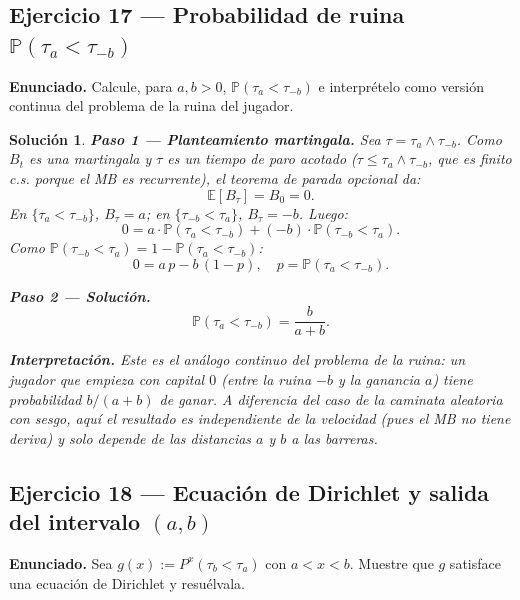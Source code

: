 \documentclass[12pt,letterpaper]{article}
\theoremstyle{ejercicio}
\theoremstyle{solucion}
\newtheorem*{solucion}{Solución}
\newcommand{\E}{\mathbb{E}}
\renewcommand{\P}{\mathbb{P}}
\begin{document}
\subsection*{Ejercicio 17 — Probabilidad de ruina $\P(\tau_a<\tau_{-b})$}

\begin{recuadro}
\textbf{Enunciado.} Calcule, para $a,b>0$,
$\P(\tau_a<\tau_{-b})$
e interprételo como versión continua del problema de la ruina del jugador.
\end{recuadro}

\begin{solucion}

\textbf{Paso 1 — Planteamiento martingala.}
Sea $\tau=\tau_a\wedge\tau_{-b}$. Como $B_t$ es una martingala y $\tau$ es un tiempo de paro
acotado ($\tau\le\tau_a\wedge\tau_{-b}$, que es finito c.s. porque el MB es recurrente), el
teorema de parada opcional da:
\[
  \E[B_\tau] = B_0 = 0.
\]
En $\{\tau_a<\tau_{-b}\}$, $B_\tau=a$; en $\{\tau_{-b}<\tau_a\}$, $B_\tau=-b$. Luego:
\[
  0 = a\cdot\P(\tau_a<\tau_{-b}) + (-b)\cdot\P(\tau_{-b}<\tau_a).
\]
Como $\P(\tau_{-b}<\tau_a)=1-\P(\tau_a<\tau_{-b})$:
\[
  0 = a\,p - b\,(1-p),\quad p=\P(\tau_a<\tau_{-b}).
\]

\textbf{Paso 2 — Solución.}
\[
  \boxed{\P(\tau_a<\tau_{-b}) = \frac{b}{a+b}.}
\]

\textbf{Interpretación.}
Este es el análogo continuo del problema de la ruina: un jugador que empieza con capital $0$
(entre la ruina $-b$ y la ganancia $a$) tiene probabilidad $b/(a+b)$ de ganar. A diferencia del
caso de la caminata aleatoria con sesgo, aquí el resultado es independiente de la velocidad
(pues el MB no tiene deriva) y solo depende de las distancias $a$ y $b$ a las barreras.
\end{solucion}

\subsection*{Ejercicio 18 — Ecuación de Dirichlet y salida del intervalo $(a,b)$}

\begin{recuadro}
\textbf{Enunciado.} Sea $g(x):=P^x(\tau_b<\tau_a)$ con $a<x<b$.
Muestre que $g$ satisface una ecuación de Dirichlet y resuélvala.
\end{recuadro}
\end{document}
